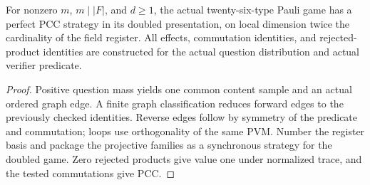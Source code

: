 \begin{lemma}
\label{lem:intro-honest-full-pauli}
\leanok
For nonzero $m$, $m\mid|F|$, and $d\geq1$, the actual twenty-six-type
Pauli game has a perfect PCC strategy in its doubled presentation, on local
dimension twice the cardinality of the field register. All effects,
commutation identities, and rejected-product identities are constructed
for the actual question distribution and actual verifier predicate.
\end{lemma}
\begin{proof}
\leanok
Positive question mass yields one common content sample and an actual
ordered graph edge. A finite graph classification reduces forward edges
to the previously checked identities. Reverse edges follow by symmetry
of the predicate and commutation; loops use orthogonality of the same PVM.
Number the register basis and package the projective families as a
synchronous strategy for the doubled game. Zero rejected products give
value one under normalized trace, and the tested commutations give PCC.
\end{proof}

